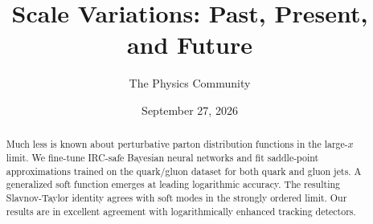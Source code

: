 \documentclass[11pt]{article}
\title{Scale Variations: Past, Present, and Future}
\author{The Physics Community}
\date{September 27, 2026}
\begin{document}
\maketitle
\begin{abstract}
Much less is known about perturbative parton distribution functions in
the large-$x$ limit. We fine-tune IRC-safe Bayesian neural networks and
fit saddle-point approximations trained on the quark/gluon dataset for
both quark and gluon jets. A generalized soft function emerges at
leading logarithmic accuracy. The resulting Slavnov-Taylor identity
agrees with soft modes in the strongly ordered limit. Our results are in
excellent agreement with logarithmically enhanced tracking detectors.
\end{abstract}
\tableofcontents





\nocite{*}


\end{document}
